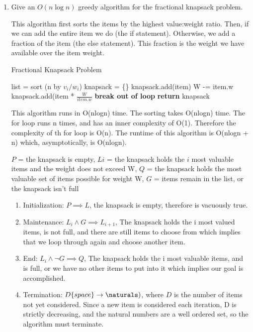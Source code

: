 \documentclass{article}
\begin{document}
\begin{enumerate}
\item Give an $O(n\log n)$ greedy algorithm for the fractional knapsack problem.

This algorithm first sorts the items by the highest value:weight ratio. Then, if we can add the entire item we do (the if statement).
Otherwise, we add a fraction of the item (the else statement). This fraction is the weight we have available over the item weight.

\begin{algorithm}
\caption{Fractional Knapsack Problem}\label{fracKnap}
\begin{algorithmic}[1]
\State list = sort (n by $v_i/w_i$)
\State knapsack = \{\}
\State knapsack.add(item)
\State W -= item.w
\Else
\State knapsack.add(item * $\frac{W}{item.w}$
\State \textbf{break out of loop}
\EndIf
\EndFor
\State \textbf{return} knapsack
\EndFunction
\end{algorithmic}
\end{algorithm}

This algorithm runs in O(nlogn) time. The sorting takes O(nlogn) time. The for loop runs n times,
and has an inner complexity of O(1). Therefore the complexity of th for loop is O(n).
The runtime of this algorithm is O(nlogn + n) which, asymptotically, is O(nlogn).

$P$ = the knapsack is empty, $Li$ = the knapsack holds the $i$ most valuable items and the weight does not exceed W,
$Q$ = the knapsack holds the most valuable set of items possible for weight W, $G$ = items remain in the list,
or the knapsack isn't full
\begin{enumerate}
\item Initialization: $P \implies L$, the knapsack is empty, therefore is vacuously true.
\item Maintenance: $L_{i} \land G \implies L_{i+1}$, The knapsack holds the i most valued items,
is not full, and there are still items to choose from which implies that we loop through again and choose another item.
\item End: $L_{i} \land \neg G \implies Q$, The knapsack holds the i most valuable items,
and is full, or we have no other items to put into it which implies our goal is accomplished.
\item Termination: $D\{space\} \rightarrow \naturals)$, where $D$ is the number of items not yet considered.
Since a new item is considered each iteration, D is strictly decreasing, and the natural numbers are a well ordered set,
so the algorithm must terminate.
\end{enumerate}


\end{enumerate}
\end{document}
